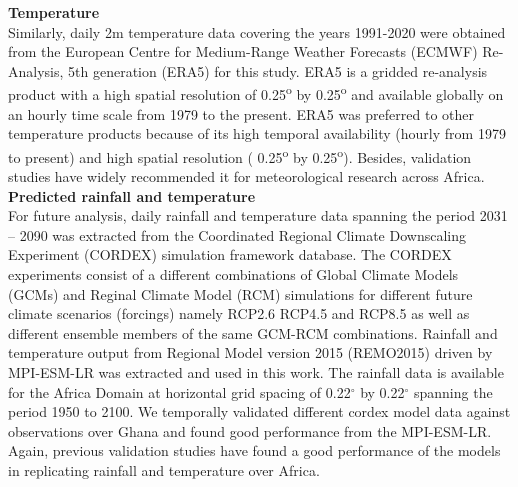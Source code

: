 \documentclass[utf8]{FrontiersinHarvard} %
\begin{document}
\textbf{Temperature}\\
Similarly, daily 2m temperature data covering the years 1991-2020 were obtained from the European Centre for Medium-Range Weather Forecasts (ECMWF) Re-Analysis, 5th generation (ERA5) \citep{hersbach2020era5} for this study. ERA5 is a gridded re-analysis product with a high spatial resolution of 0.25\textsuperscript{o} by 0.25\textsuperscript{o} and available globally on an hourly time scale from 1979 to the present. ERA5 was preferred to other temperature products because of its high temporal availability (hourly from 1979 to present) and high spatial resolution ( 0.25\textsuperscript{o} by 0.25\textsuperscript{o}). Besides, validation studies \citep{gleixner2020did, parsons2022evaluation} have widely recommended it for meteorological research across Africa. \\

\textbf{Predicted rainfall and temperature }\\
For future analysis, daily rainfall and temperature data spanning the period 2031 -- 2090 was extracted from the Coordinated Regional Climate Downscaling Experiment (CORDEX) simulation framework database. The CORDEX experiments consist of a different combinations of Global Climate Models (GCMs) and Reginal Climate Model (RCM) simulations for different future climate scenarios (forcings) namely RCP2.6 RCP4.5 and RCP8.5 as well as different ensemble members of the same GCM-RCM combinations. Rainfall and temperature output from Regional Model version 2015 (REMO2015) driven by MPI-ESM-LR was extracted and used in this work. The rainfall data is available for the Africa Domain at horizontal grid spacing of 0.22$^{\circ}$ by 0.22$^{\circ}$ spanning the period 1950 to 2100. We temporally validated different cordex model data against observations over Ghana and found good performance from the MPI-ESM-LR. Again, previous validation studies \citep{ilori2021evaluating} have found a good performance of the models in replicating rainfall and temperature over Africa.   
\end{document}
